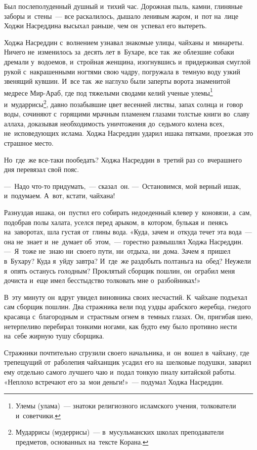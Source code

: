\documentclass[12pt,a4paper]{book}
\begin{document}
Был послеполуденный душный и~тихий час. Дорожная пыль, камни, глиняные заборы и~стены~— все раскалилось, дышало ленивым жаром, и~пот на~лице Ходжи Насреддина высыхал раньше, чем он~успевал его вытереть.

Ходжа Насреддин с~волнением узнавал знакомые улицы, чайханы и~минареты. Ничего не~изменилось за~десять лет в~Бухаре, все так~же облезшие собаки дремали у~водоемов, и~стройная женщина, изогнувшись и~придерживая смуглой рукой с~накрашенными ногтями свою чадру, погружала в~темную воду узкий звенящий кувшин. И~все так~же наглухо были заперты ворота знаменитой медресе Мир-Араб, где под тяжелыми сводами келий ученые улемы\footnote{Улемы (улама)~— знатоки религиозного исламского учения, толкователи и~советчики.} и~мударрисы\footnote{Мударрисы (мудеррисы)~— в~мусульманских школах преподаватели предметов, основанных на~тексте Корана.}, давно позабывшие цвет весенней листвы, запах солнца и~говор воды, сочиняют с~горящими мрачным пламенем глазами толстые книги во~славу аллаха, доказывая необходимость уничтожения до~седьмого колена всех, не~исповедующих ислама. Ходжа Насреддин ударил ишака пятками, проезжая это страшное место.

Но~где~же все-таки пообедать? Ходжа Насреддин в~третий раз со~вчерашнего дня перевязал свой пояс.

—~Надо что-то придумать,~— сказал~он. —~Остановимся, мой верный ишак, и~подумаем. А~вот, кстати, чайхана!

Разнуздав ишака, он~пустил его собирать недоеденный клевер у~коновязи, а~сам, подобрав полы халата, уселся перед арыком, в~котором, булькая и~пенясь на~заворотах, шла густая от~глины вода. «Куда, зачем и~откуда течет эта вода~— она не~знает и~не~думает об~этом,~— горестно размышлял Ходжа Насреддин. —~Я~тоже не~знаю ни~своего пути, ни~отдыха, ни~дома. Зачем я~пришел в~Бухару? Куда я~уйду завтра? И~где~же раздобыть полтаньга на~обед? Неужели я~опять останусь голодным? Проклятый сборщик пошлин, он~ограбил меня дочиста и~еще имел бесстыдство толковать мне о~разбойниках!»

В~эту минуту он~вдруг увидел виновника своих несчастий. К~чайхане подъехал сам сборщик пошлин. Два стражника вели под уздцы арабского жеребца, гнедого красавца с~благородным и~страстным огнем в~темных глазах. Он, пригибая шею, нетерпеливо перебирал тонкими ногами, как будто ему было противно нести на~себе жирную тушу сборщика.

Стражники почтительно сгрузили своего начальника, и~он~вошел в~чайхану, где трепещущий от~раболепия чайханщик усадил его на~шелковые подушки, заварил ему отдельно самого лучшего чаю и~подал тонкую пиалу китайской работы. «Неплохо встречают его за~мои деньги!»~— подумал Ходжа Насреддин.
\end{document}
